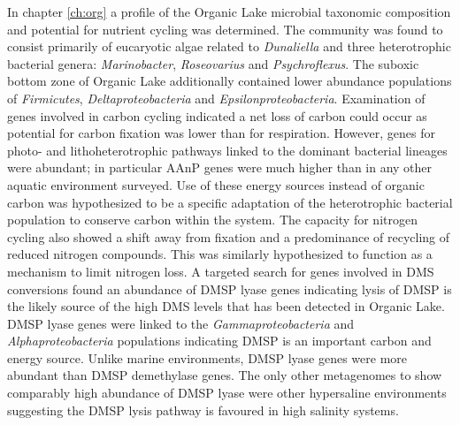 In chapter \ref{ch:org} a profile of the Organic Lake microbial taxonomic composition and potential for nutrient cycling was determined.
The community was found to consist primarily of eucaryotic algae related to \emph{Dunaliella} and three heterotrophic bacterial genera: \emph{Marinobacter}, \emph{Roseovarius} and \emph{Psychroflexus}.
The suboxic bottom zone of Organic Lake additionally contained lower abundance populations of \emph{Firmicutes}, \emph{Deltaproteobacteria} and \emph{Epsilonproteobacteria}.
Examination of genes involved in carbon cycling indicated a net loss of carbon could occur as potential for carbon fixation was lower than for respiration.
However, genes for photo- and lithoheterotrophic pathways linked to the dominant bacterial lineages were abundant; in particular \ac{AAnP} genes were much higher than in any other aquatic environment surveyed.
Use of these energy sources instead of organic carbon was hypothesized to be a specific adaptation of the heterotrophic bacterial population to conserve carbon within the system.
The capacity for nitrogen cycling also showed a shift away from fixation and a predominance of recycling of reduced nitrogen compounds.
This was similarly hypothesized to function as a mechanism to limit nitrogen loss.
A targeted search for genes involved in \ac{DMS} conversions found an abundance of \ac{DMSP} lyase genes indicating lysis of \ac{DMSP} is the likely source of the high \ac{DMS} levels that has been detected in Organic Lake.
\ac{DMSP} lyase genes were linked to the \emph{Gammaproteobacteria} and \emph{Alphaproteobacteria} populations indicating \ac{DMSP} is an important carbon and energy source.
Unlike marine environments, \ac{DMSP} lyase genes were more abundant than \ac{DMSP} demethylase genes. 
The only other metagenomes to show comparably high abundance of \ac{DMSP} lyase were other hypersaline environments suggesting the DMSP lysis pathway is favoured in high salinity systems. 

